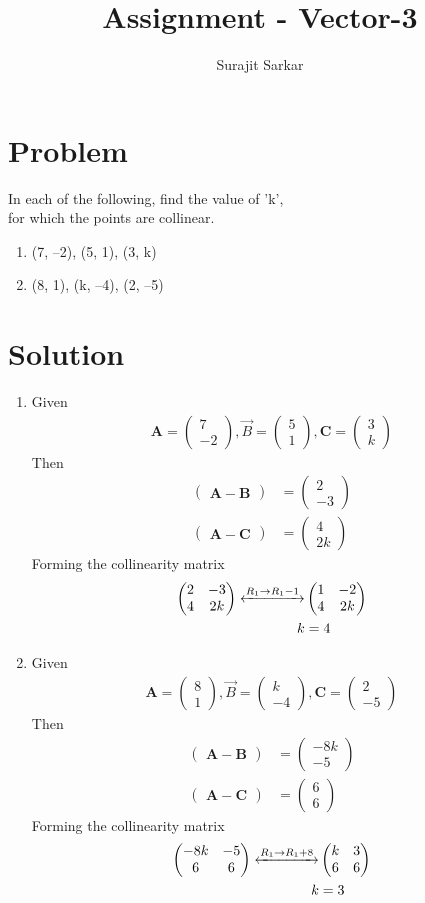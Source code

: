\documentclass[journal,12pt,twocolumn]{IEEEtran}
\title{\mytitle}
\title{
Assignment - Vector-3
}
\author{Surajit Sarkar}
\newcommand{\myvec}[1]{\ensuremath{\begin{pmatrix}#1\end{pmatrix}}}
\let\vec\mathbf
\begin{document}
\maketitle
\tableofcontents
\bigskip
\section{\textbf{Problem}}
In each of the following, find the value of ’k’,\\ for which the points are collinear.
\begin{enumerate}[label=(\roman*)]
\item (7, –2), (5, 1), (3, k)
\item(8, 1), (k, –4), (2, –5)
\end{enumerate}
\section{\textbf{Solution}}
\begin{enumerate}[label=(\roman*)]
    \item Given
    \begin{align}
      \vec{A}=\myvec{7\\-2},\Vec{B}=\myvec{5\\1},\vec{C}=\myvec{3\\k}  
    \end{align}
    Then
    \begin{align}
        \myvec{\vec{A}-\vec{B}}&=\myvec{2\\-3}\\
        \myvec{\vec{A}-\vec{C}}&=\myvec{4\\2k}\
    \end{align}
    Forming the collinearity matrix
    \begin{align}
        \myvec{2&-3\\4&2k} \xleftrightarrow{R_1\rightarrow{R_1-1}}&\myvec{1&-2\\4&2k}\\
        k&=4
        \end{align}
    
    \item Given
     \begin{align}
      \vec{A}=\myvec{8\\1},\Vec{B}=\myvec{k\\-4},\vec{C}=\myvec{2\\-5}  
    \end{align}
    Then
    \begin{align}
        \myvec{\vec{A}-\vec{B}}&=\myvec{-8k\\-5}\\
        \myvec{\vec{A}-\vec{C}}&=\myvec{6\\6}\
    \end{align}
    Forming the collinearity matrix
    \begin{align}
        \myvec{-8k&-5\\6&6} \xleftrightarrow{R_1\rightarrow{R_1+8}}&\myvec{k&3\\6&6}\\
        k&=3
        \end{align}
\end{enumerate}
\end{document}
